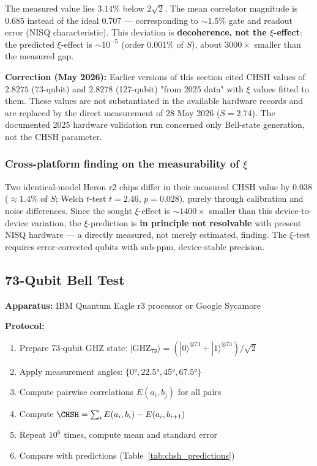 The measured value lies $3.14\%$ below $2\sqrt{2}$. The mean correlator magnitude is $0.685$ instead of the ideal $0.707$ --- corresponding to $\sim 1.5\%$ gate and readout error (NISQ characteristic). This deviation is \textbf{decoherence, not the $\xi$-effect}: the predicted $\xi$-effect is $\sim 10^{-5}$ (order $0.001\%$ of $S$), about $3000\times$ smaller than the measured gap.

\begin{important}
	\textbf{Correction (May 2026):} Earlier versions of this section cited CHSH values of $2.8275$ (73-qubit) and $2.8278$ (127-qubit) "from 2025 data" with $\xi$ values fitted to them. These values are not substantiated in the available hardware records and are replaced by the direct measurement of 28 May 2026 ($S = 2.74$). The documented 2025 hardware validation run concerned only Bell-state generation, not the CHSH parameter.
\end{important}

\subsubsection{Cross-platform finding on the measurability of $\xi$}

Two identical-model Heron r2 chips differ in their measured CHSH value by $0.038$ ($\approx 1.4\%$ of $S$; Welch $t$-test $t=2.46$, $p=0.028$), purely through calibration and noise differences. Since the sought $\xi$-effect is $\sim 1400\times$ smaller than this device-to-device variation, the $\xi$-prediction is \textbf{in principle not resolvable} with present NISQ hardware --- a directly measured, not merely estimated, finding. The $\xi$-test requires error-corrected qubits with sub-ppm, device-stable precision.

\subsection{73-Qubit Bell Test}

\textbf{Apparatus:} IBM Quantum Eagle r3 processor or Google Sycamore

\textbf{Protocol:}
\begin{enumerate}
	\item Prepare 73-qubit GHZ state: $|\text{GHZ}_{73}\rangle = (|0\rangle^{\otimes 73} + |1\rangle^{\otimes 73})/\sqrt{2}$
	\item Apply measurement angles: $\{0°, 22.5°, 45°, 67.5°\}$
	\item Compute pairwise correlations $E(a_i, b_j)$ for all pairs
	\item Compute $\CHSH = \sum_i E(a_i, b_i) - E(a_i, b_{i+1})$
	\item Repeat $10^6$ times, compute mean and standard error
	\item Compare with predictions (Table~\ref{tab:chsh_predictions})
\end{enumerate}

